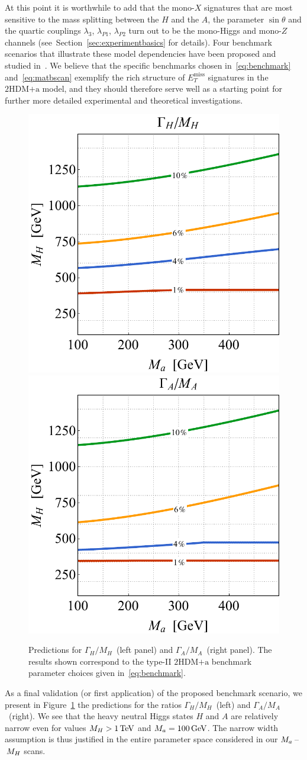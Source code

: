 \documentclass[a4paper, 11pt,notoc]{article}
\newcommand{\MET}{\ensuremath{E_T^\mathrm{miss}}\xspace}
\newcommand{\hdma}{\ensuremath{\textrm{2HDM+a}}\xspace}
\begin{document}
At this point it is worthwhile to add that the mono-$X$ signatures that are most sensitive to the mass splitting between the $H$ and the $A$, the parameter $\sin \theta$ and the quartic couplings $\lambda_{3}$, $\lambda_{P1}$, $\lambda_{P2}$ turn out to be  the mono-Higgs and mono-$Z$ channels (see~Section~\ref{sec:experimentbasics} for details). Four benchmark scenarios that illustrate these model dependencies have been proposed and studied in~\cite{Bauer:2017ota}.  We believe that the specific benchmarks  chosen in~\eqref{eq:benchmark} and~\eqref{eq:matbscan}   exemplify  the rich structure of $\MET$ signatures in the \hdma model, and they should therefore serve well as a starting point for further more detailed experimental and theoretical investigations. 

\begin{figure}[t!]
\centering
\includegraphics[height=.45\textwidth]{figure5l.pdf} \qquad 
\includegraphics[height=.45\textwidth]{figure5r.pdf}
\vspace{4mm}
\caption{\label{fig:Gammas}  Predictions for  $\Gamma_H/M_H$~(left panel) and $\Gamma_A/M_A$~(right panel). The results shown correspond to the type-II \hdma benchmark parameter choices given in~\eqref{eq:benchmark}.}
\end{figure}

As a final validation (or first application) of the proposed benchmark scenario, we present in  Figure~\ref{fig:Gammas} the predictions for the ratios $\Gamma_H/M_H$~(left) and $\Gamma_A/M_A$~(right). We see that the heavy neutral Higgs states $H$ and $A$ are relatively narrow even for values $M_H > 1 \, {\rm TeV}$ and $M_a = 100 \, {\rm GeV}$.  The narrow width assumption is thus justified in the entire parameter space considered in our $M_a\hspace{0.5mm}$--$\hspace{0.5mm}M_H$ scans. 
\end{document}
